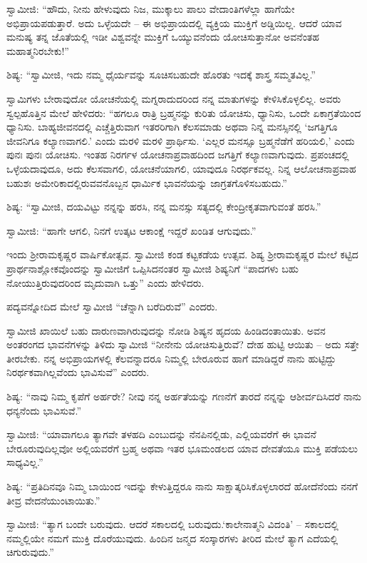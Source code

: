  ಸ್ವಾಮೀಜಿ: “ಹೌದು, ನೀನು ಹೇಳುವುದು ನಿಜ, ಮುಕ್ಕಾಲು ಪಾಲು ವೇದಾಂತಿಗಳೆಲ್ಲಾ ಹಾಗೆಯೇ ಅಭಿಪ್ರಾಯಪಡುತ್ತಾರೆ. ಅದು ಒಳ್ಳೆಯದೇ – ಈ ಅಭಿಪ್ರಾಯದಲ್ಲಿ ವ್ಯಕ್ತಿಯ ಮುಕ್ತಿಗೆ ಅಡ್ಡಿಯಿಲ್ಲ. ಆದರೆ ಯಾವ ಮನುಷ್ಯ ತನ್ನ ಜೊತೆಯಲ್ಲಿ ಇಡೀ ವಿಶ್ವವನ್ನೇ ಮುಕ್ತಿಗೆ ಒಯ್ಯುವನೆಂದು ಯೋಚಿಸುತ್ತಾನೋ ಅವನೆಂತಹ ಮಹಾತ್ಮನಿರಬೇಕು!” 

 ಶಿಷ್ಯ: “ಸ್ವಾಮೀಜಿ, ಇದು ನಮ್ಮ ಧೈರ್ಯವನ್ನು ಸೂಚಿಸಬಹುದೇ ಹೊರತು ಇದಕ್ಕೆ ಶಾಸ್ತ್ರ ಸಮ್ಮತವಿಲ್ಲ.” 

 ಸ್ವಾಮಿಗಳು ಬೇರಾವುದೋ ಯೋಚನೆಯಲ್ಲಿ ಮಗ್ನರಾದುದರಿಂದ ನನ್ನ ಮಾತುಗಳನ್ನು ಕೇಳಿಸಿಕೊಳ್ಳಲಿಲ್ಲ. ಅವರು ಸ್ವಲ್ಪಹೊತ್ತಿನ ಮೇಲೆ ಹೇಳಿದರು: “ಹಗಲೂ ರಾತ್ರಿ ಬ್ರಹ್ಮನನ್ನು ಕುರಿತು ಯೋಚಿಸು, ಧ್ಯಾನಿಸು, ಒಂದೇ ಏಕಾಗ್ರತೆಯಿಂದ ಧ್ಯಾನಿಸು. ಬಾಹ್ಯಜೀವನದಲ್ಲಿ ಎಚ್ಚೆತ್ತಿರುವಾಗ ಇತರರಿಗಾಗಿ ಕೆಲಸಮಾಡು ಅಥವಾ ನಿನ್ನ ಮನಸ್ಸಿನಲ್ಲಿ ‘ಜಗತ್ತಿಗೂ ಜೀವನಿಗೂ ಕಲ್ಯಾಣವಾಗಲಿ.’ ಎಂದು ಮರಳಿ ಮರಳಿ ಪ್ರಾರ್ಥಿಸು. ‘ಎಲ್ಲರ ಮನಸ್ಸೂ ಬ್ರಹ್ಮನೆಡೆಗೆ ಹರಿಯಲಿ,’ ಎಂದು ಪುನಃ ಪುನಃ ಯೋಚಿಸು. ಇಂತಹ ನಿರರ್ಗಳ ಯೋಚನಾಪ್ರವಾಹದಿಂದ ಜಗತ್ತಿಗೆ ಕಲ್ಯಾಣವಾಗುವುದು. ಪ್ರಪಂಚದಲ್ಲಿ ಒಳ್ಳೆಯದಾವುದೂ, ಅದು ಕೆಲಸವಾಗಲಿ, ಯೋಚನೆಯಾಗಲಿ, ಯಾವುದೂ ನಿರರ್ಥಕವಲ್ಲ. ನಿನ್ನ ಆಲೋಚನಾಪ್ರವಾಹ ಬಹುಶಃ ಅಮೇರಿಕಾದಲ್ಲಿರುವವನೊಬ್ಬನ ಧಾರ್ಮಿಕ ಭಾವನೆಯನ್ನು ಜಾಗ್ರತಗೊಳಿಸಬಹುದು.” 

 ಶಿಷ್ಯ: “ಸ್ವಾಮೀಜಿ, ದಯವಿಟ್ಟು ನನ್ನನ್ನು ಹರಸಿ, ನನ್ನ ಮನಸ್ಸು ಸತ್ಯದಲ್ಲಿ ಕೇಂದ್ರೀಕೃತವಾಗುವಂತೆ ಹರಸಿ.” 

 ಸ್ವಾಮೀಜಿ: “ಹಾಗೇ ಆಗಲಿ, ನಿನಗೆ ಉತ್ಕಟ ಆಕಾಂಕ್ಷೆ ಇದ್ದರೆ ಖಂಡಿತ ಆಗುವುದು.” 

\delimiter

 ಇಂದು ಶ‍್ರೀರಾಮಕೃಷ್ಣರ ವಾರ್ಷಿಕೋತ್ಸವ. ಸ್ವಾಮೀಜಿ ಕಂಡ ಕಟ್ಟಕಡೆಯ ಉತ್ಸವ. ಶಿಷ್ಯ ಶ‍್ರೀರಾಮಕೃಷ್ಣರ ಮೇಲೆ ಕಟ್ಟಿದ ಪ್ರಾರ್ಥನಾಶ್ಲೋಕವೊಂದನ್ನು ಸ್ವಾಮೀಜಿಗೆ ಒಪ್ಪಿಸಿದನಂತರ ಸ್ವಾಮೀಜಿ ಶಿಷ್ಯನಿಗೆ “ಪಾದಗಳು ಬಹು ನೋಯುತ್ತಿರುವುದರಿಂದ ಮೃದುವಾಗಿ ಒತ್ತು” ಎಂದು ಹೇಳಿದರು. 

 ಪದ್ಯವನ್ನೋದಿದ ಮೇಲೆ ಸ್ವಾಮೀಜಿ “ಚೆನ್ನಾಗಿ ಬರೆದಿರುವೆ” ಎಂದರು. 

 ಸ್ವಾಮೀಜಿ ಖಾಯಿಲೆ ಬಹು ದಾರುಣವಾಗಿರುವುದನ್ನು ನೋಡಿ ಶಿಷ್ಯನ ಹೃದಯ ಹಿಂಡಿದಂತಾಯಿತು. ಅವನ ಅಂತರಂಗದ ಭಾವನೆಗಳನ್ನು ತಿಳಿದು ಸ್ವಾಮೀಜಿ “ನೀನೇನು ಯೋಚಿಸುತ್ತಿರುವೆ? ದೇಹ ಹುಟ್ಟಿ ಆಯಿತು – ಅದು ಸತ್ತೇ ತೀರಬೇಕು. ನನ್ನ ಅಭಿಪ್ರಾಯಗಳಲ್ಲಿ ಕೆಲವನ್ನಾದರೂ ನಿಮ್ಮಲ್ಲಿ ಬೇರೂರುವ ಹಾಗೆ ಮಾಡಿದ್ದರೆ ನಾನು ಹುಟ್ಟಿದ್ದು ನಿರರ್ಥಕವಾಗಿಲ್ಲವೆಂದು ಭಾವಿಸುವೆ” ಎಂದರು. 

 ಶಿಷ್ಯ: “ನಾವು ನಿಮ್ಮ ಕೃಪೆಗೆ ಅರ್ಹರೇ? ನೀವು ನನ್ನ ಅರ್ಹತೆಯನ್ನು ಗಣನೆಗೆ ತಾರದೆ ನನ್ನನ್ನು ಆಶೀರ್ವದಿಸಿದರೆ ನಾನು ಧನ್ಯನೆಂದು ಭಾವಿಸುವೆ.” 

 ಸ್ವಾಮೀಜಿ: “ಯಾವಾಗಲೂ ತ್ಯಾಗವೇ ತಳಹದಿ ಎಂಬುದನ್ನು ನೆನಪಿನಲ್ಲಿಡು, ಎಲ್ಲಿಯವರೆಗೆ ಈ ಭಾವನೆ ಬೇರೂರುವುದಿಲ್ಲವೋ ಅಲ್ಲಿಯವರೆಗೆ ಬ್ರಹ್ಮ ಅಥವಾ ಇತರ ಭೂಮಂಡಲದ ಯಾವ ದೇವತೆಯೂ ಮುಕ್ತಿ ಪಡೆಯಲು ಸಾಧ್ಯವಿಲ್ಲ.” 

 ಶಿಷ್ಯ: “ಪ್ರತಿದಿನವೂ ನಿಮ್ಮ ಬಾಯಿಂದ ಇದನ್ನು ಕೇಳುತ್ತಿದ್ದರೂ ನಾನು ಸಾಕ್ಷಾತ್ಕರಿಸಿಕೊಳ್ಳಲಾರದೆ ಹೋದೆನೆಂದು ನನಗೆ ತೀವ್ರ ವೇದನೆಯುಂಟಾಯಿತು.” 

 ಸ್ವಾಮೀಜಿ: “ತ್ಯಾಗ ಬಂದೇ ಬರುವುದು. ಆದರೆ ಸಕಾಲದಲ್ಲಿ ಬರುವುದು.\break ‘ಕಾಲೇನಾತ್ಮನಿ ವಿದಂತಿ’ – ಸಕಾಲದಲ್ಲಿ ನಮ್ಮಲ್ಲಿಯೇ ನಮಗೆ ಮುಕ್ತಿ ದೊರೆಯುವುದು. ಹಿಂದಿನ ಜನ್ಮದ ಸಂಸ್ಕಾರಗಳು ತೀರಿದ ಮೇಲೆ ತ್ಯಾಗ ಎದೆಯಲ್ಲಿ ಚಿಗುರುವುದು.” 

